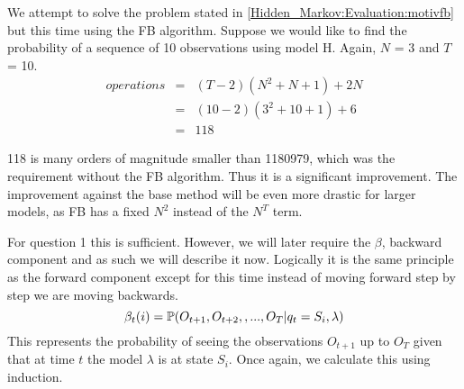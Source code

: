     \begin{example}
        \label{Hidden_Markov:Evaluation:motivfb2}
        We attempt to solve the problem stated in \ref{Hidden_Markov:Evaluation:motivfb} but this time using the FB algorithm. Suppose we would like to find the probability of a sequence of 10 observations using model H. Again, $N$ = 3 and $T$ = 10. 
        \begin{eqnarray}
            operations & = & (T-2)(N^2 + N + 1) + 2N \\
                    & = & (10-2)(3^2 + 10 + 1) + 6\\
                    & = & 118
        \end{eqnarray}

        118 is many orders of magnitude smaller than 1180979, which was the requirement without the FB algorithm. Thus it is a significant improvement. The improvement against the base method will be even more drastic for larger models, as FB has a fixed $N^2$ instead of the $N^T$ term.  
    \end{example}


    For question 1 this is sufficient. However, we will later require the $\beta$, backward component and as such we will describe it now. Logically it is the same principle as the forward component except for this time instead of moving forward step by step we are moving backwards.
    \begin{equation}
        \label{Hidden_Markov:Evaluation:Forward_Backward_Algorithm:Beta}
        \beta_t(i) = \mathbb{P} (O_{t+1},O_{t+2},,...,O_T | q_t=S_i, \lambda)
    \end{equation}
    This represents the probability of seeing the observations $O_{t+1}$ up to $O_T$ given that at time $t$ the model $\lambda$ is at state $S_i$. Once again, we calculate this using induction.

